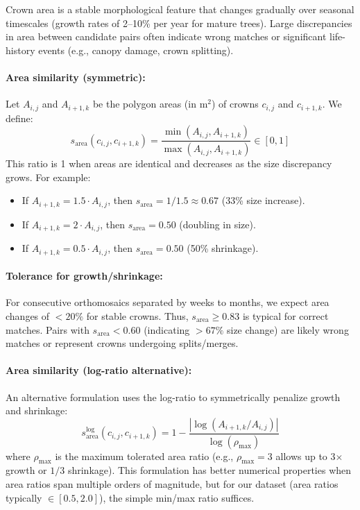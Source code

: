 Crown area is a stable morphological feature that changes gradually over seasonal timescales (growth rates of 2--10\% per year for mature trees). Large discrepancies in area between candidate pairs often indicate wrong matches or significant life-history events (e.g., canopy damage, crown splitting).

\paragraph{Area similarity (symmetric):}
Let $A_{i,j}$ and $A_{i+1,k}$ be the polygon areas (in m$^2$) of crowns $c_{i,j}$ and $c_{i+1,k}$. We define:
\[
s_{\text{area}}(c_{i,j}, c_{i+1,k}) = \frac{\min(A_{i,j}, A_{i+1,k})}{\max(A_{i,j}, A_{i+1,k})} \in [0, 1]
\]
This ratio is 1 when areas are identical and decreases as the size discrepancy grows. For example:
\begin{itemize}
    \item If $A_{i+1,k} = 1.5 \cdot A_{i,j}$, then $s_{\text{area}} = 1/1.5 \approx 0.67$ (33\% size increase).
    \item If $A_{i+1,k} = 2 \cdot A_{i,j}$, then $s_{\text{area}} = 0.50$ (doubling in size).
    \item If $A_{i+1,k} = 0.5 \cdot A_{i,j}$, then $s_{\text{area}} = 0.50$ (50\% shrinkage).
\end{itemize}

\paragraph{Tolerance for growth/shrinkage:}
For consecutive orthomosaics separated by weeks to months, we expect area changes of $<20\%$ for stable crowns. Thus, $s_{\text{area}} \geq 0.83$ is typical for correct matches. Pairs with $s_{\text{area}} < 0.60$ (indicating $>67\%$ size change) are likely wrong matches or represent crowns undergoing splits/merges.

\paragraph{Area similarity (log-ratio alternative):}
An alternative formulation uses the log-ratio to symmetrically penalize growth and shrinkage:
\[
s_{\text{area}}^{\text{log}}(c_{i,j}, c_{i+1,k}) = 1 - \frac{|\log(A_{i+1,k} / A_{i,j})|}{\log(\rho_{\max})}
\]
where $\rho_{\max}$ is the maximum tolerated area ratio (e.g., $\rho_{\max} = 3$ allows up to 3$\times$ growth or $1/3$ shrinkage). This formulation has better numerical properties when area ratios span multiple orders of magnitude, but for our dataset (area ratios typically $\in [0.5, 2.0]$), the simple min/max ratio suffices.

